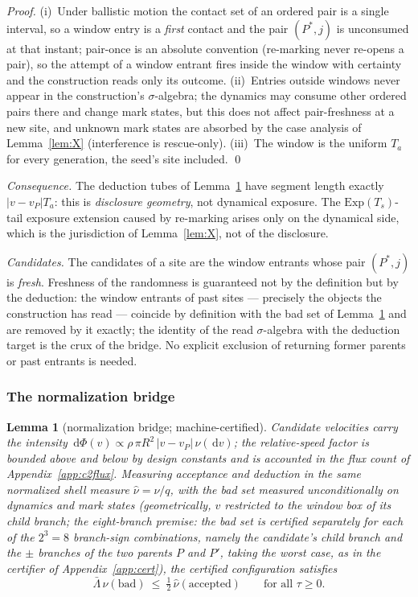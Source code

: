\documentclass[11pt]{article}
\newtheorem{lemma}{Lemma}
\newcommand{\dd}{\,\mathrm{d}}
\newcommand{\Ts}{T_s}
\newcommand{\Ta}{T_a}
\newcommand{\relL}{\bar\Lambda}
\begin{document}
\noindent\emph{Proof.} (i)~Under ballistic motion the contact set of an
ordered pair is a single interval, so a window entry is a \emph{first}
contact and the pair $(P^*,j)$ is unconsumed at that instant; pair-once is
an absolute convention (re-marking never re-opens a pair), so the attempt
of a window entrant fires inside the window with certainty and the
construction reads only its outcome. (ii)~Entries outside windows never
appear in the construction's $\sigma$-algebra; the dynamics may consume
other ordered pairs there and change mark states, but this does not affect
pair-freshness at a new site, and unknown mark states are absorbed by the
case analysis of Lemma~\ref{lem:X} (interference is rescue-only).
(iii)~The window is the uniform $\Ta$ for every generation, the seed's
site included. \qed

\smallskip
\emph{Consequence.} The deduction tubes of Lemma~\ref{lem:bridge} have
segment length exactly $|v-v_P|\Ta$: this is \emph{disclosure geometry},
not dynamical exposure. The $\mathrm{Exp}(\Ts)$-tail exposure extension
caused by re-marking arises only on the dynamical side, which is the
jurisdiction of Lemma~\ref{lem:X}, not of the disclosure.

\smallskip
\emph{Candidates.} The candidates of a site are the window entrants whose
pair $(P^*,j)$ is \emph{fresh}. Freshness of the randomness is guaranteed
not by the definition but by the deduction: the window entrants of past
sites --- precisely the objects the construction has read --- coincide by
definition with the bad set of Lemma~\ref{lem:bridge} and are removed by it
exactly; the identity of the read $\sigma$-algebra with the deduction
target is the crux of the bridge. No explicit exclusion of returning
former parents or past entrants is needed.

\subsubsection{The normalization bridge}\label{app:c2bridge}

\begin{lemma}[normalization bridge; machine-certified]\label{lem:bridge}
Candidate velocities carry the intensity
$\dd\Phi(v)\propto\rho\,\pi R^2\,|v-v_P|\,\nu(\dd v)$; the relative-speed
factor is bounded above and below by design constants and is accounted in
the flux count of Appendix~\ref{app:c2flux}. Measuring acceptance and
deduction in the \emph{same} normalized shell measure $\hat\nu=\nu/q$, with
the bad set measured unconditionally on dynamics and mark states
(geometrically, $v$ restricted to the window box of its child branch; the
eight-branch premise: the bad set is certified separately for each of the
$2^3=8$ branch-sign combinations, namely the candidate's child branch and
the $\pm$ branches of the two parents $P$ and $P'$, taking the worst case,
as in the certifier of Appendix~\ref{app:cert}), the certified
configuration satisfies
\[
  \relL\,\hat\nu(\mathrm{bad})\ \le\ \tfrac12\,\hat\nu(\mathrm{accepted})
  \qquad\text{for all }\tau\ge0 .
\]
\end{lemma}
\end{document}
